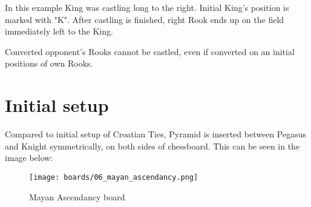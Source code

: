 In this example King was castling long to the right. Initial King's position is marked with "K".
After castling is finished, right Rook ends up on the field immediately left to the King.

Converted opponent's Rooks cannot be castled, even if converted on an initial positions
of own Rooks.

\clearpage %

\section*{Initial setup}

Compared to initial setup of Croatian Ties, Pyramid is inserted between Pegasus and Knight
symmetrically, on both sides of chessboard. This can be seen in the image below:

\noindent
\begin{figure}[h]
\texttt{[image: boards/06\_mayan\_ascendancy.png]}
\caption{Mayan Ascendancy board}
\label{fig:06_mayan_ascendancy}
\end{figure}

\clearpage %
